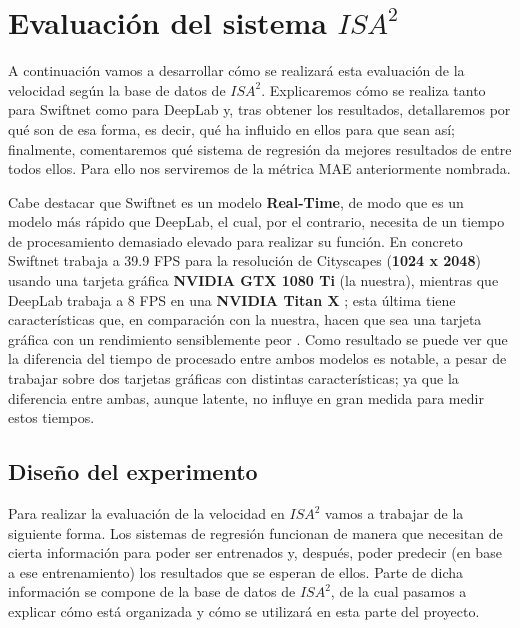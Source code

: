\section{Evaluación del sistema $ISA^{2}$}

A continuación vamos a desarrollar cómo se realizará esta evaluación de la velocidad según la base de datos de $ISA^{2}$. Explicaremos cómo se realiza tanto para Swiftnet como para DeepLab y, tras obtener los resultados, detallaremos por qué son de esa forma, es decir, qué ha influido en ellos para que sean así; finalmente, comentaremos qué sistema de regresión da mejores resultados de entre todos ellos. Para ello nos serviremos de la métrica \ac{MAE} anteriormente nombrada.

Cabe destacar que Swiftnet \cite{swiftnet} es un modelo \textbf{Real-Time}, de modo que es un modelo más rápido que DeepLab, el cual, por el contrario, necesita de un tiempo de procesamiento demasiado elevado para realizar su función. En concreto Swiftnet trabaja a 39.9 \ac{FPS} para la resolución de Cityscapes (\textbf{1024 x 2048}) usando una tarjeta gráfica \textbf{NVIDIA GTX 1080 Ti} (la nuestra), mientras que DeepLab trabaja a 8 \ac{FPS} en una \textbf{NVIDIA Titan X} \cite{deeplab}; esta última tiene características que, en comparación con la nuestra, hacen que sea una tarjeta gráfica con un rendimiento sensiblemente peor \cite{gtx_titan}. Como resultado se puede ver que la diferencia del tiempo de procesado entre ambos modelos es notable, a pesar de trabajar sobre dos tarjetas gráficas con distintas características; ya que la diferencia entre ambas, aunque latente, no influye en gran medida para medir estos tiempos. %

\subsection{Diseño del experimento}

Para realizar la evaluación de la velocidad en $ISA^{2}$ vamos a trabajar de la siguiente forma. Los sistemas de regresión funcionan de manera que necesitan de cierta información para poder ser entrenados y, después, poder predecir (en base a ese entrenamiento) los resultados que se esperan de ellos. Parte de dicha información se compone de la base de datos de $ISA^{2}$, de la cual pasamos a explicar cómo está organizada y cómo se utilizará en esta parte del proyecto.

